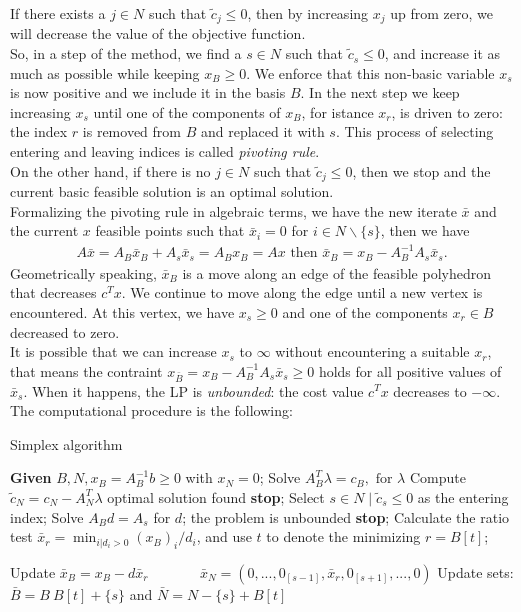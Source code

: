 \documentclass[a4paper,10 pt,titlepage,twoside]{book}
\theoremstyle{plain}
\theoremstyle{definition}
\theoremstyle{remark}
\begin{document}
 If there exists a $j \in N$ such that $\widetilde{c}_{j} \leq 0$, then by increasing $x_{j}$ up from zero, we will decrease the value of the objective function.\\
So, in a step of the method, we find a $s \in N$ such that $\widetilde{c}_{s} \leq 0$, and increase it as much as possible while keeping $x_{B} \geq 0$. We enforce that this non-basic variable $x_{s}$ is now positive and we include it in the basis $B$.
In the next step we keep increasing $x_{s}$ until one of the components of $x_{B}$, for istance $x_{r}$, is driven to zero: the index $r$ is removed from $B$ and replaced it with $s$. This process of selecting entering and leaving indices is called \textit{pivoting rule}. \\
On the other hand, if there is no $j \in N$ such that $\widetilde{c}_{j} \leq 0$, then we stop and the current basic feasible solution is an optimal solution. \\
Formalizing the pivoting rule in algebraic terms, we have the new iterate $\bar{x}$ and the current $x$ feasible points such that $\bar{x}_{i} = 0$ for $i \in N\backslash\{s\}$, then we have 
\begin{align*}
	A\bar{x} = A_{B}\bar{x}_{B} +A_{s}\bar{x}_{s} = A_{B}x_{B} = Ax \text{  then }
	\bar{x}_{B} = x_{B} - A_{B}^{-1}A_{s}\bar{x}_{s}.
\end{align*}
Geometrically speaking, $\bar{x}_{B}$ is a move along an edge of the feasible polyhedron that decreases $c^{T}x$. We continue to move along the edge until a new vertex is encountered. At this vertex, we have $x_{s}\geq0$ and one of the components $x_{r}\in B$ decreased to zero.\\
It is possible that we can increase $x_{s}$ to $\infty$ without encountering a suitable $x_{r}$, that means the contraint $x_{\bar{B}} = x_{B} - A_{B}^{-1}A_{s}\bar{x}_{s} \geq0$ holds for all positive values of $\bar{x}_{s}$. When it happens, the LP is \textit{unbounded}: the cost value $c^{T}x$ decreases to $-\infty$.\\
The computational procedure is the following:
\begin{algorithm}
	\caption{Simplex algorithm}
	\begin{algorithmic}[1]
		\State \textbf{Given} $B, N, x_{B} = A_{B}^{-1}b\geq 0$ with $x_{N}=0$;
		\State Solve $A_{B}^{T}\lambda = c_{B}, \text{ for }\lambda$
		\State Compute $\widetilde{c}_{N}=c_{N}-A_{N}^{T}\lambda$
		 optimal solution found \textbf{stop}; 
		\Else
		\State 	Select $s\in N\;|\;\widetilde{c}_{s}\leq 0$ as the entering index;
		\State Solve $A_{B}d = A_{s}$ for $d$;
		 the problem is unbounded \textbf{stop};
		\Else 
		\State Calculate the ratio test $\bar{x}_{r} = \min_{i | d_{i} > 0}(x_{B})_{i}/d_{i}$, and \State use $t$ to denote the minimizing $r = B[t]$;
		
		\State Update $\bar{x}_{B} = x_{B}-d\bar{x}_{r}$
		\State $\;\;\;\;\;\;\;\;\;\;\;\;\bar{x}_{N} = (0,...,0_{[s-1]},\bar{x}_{r},0_{[s+1]},...,0)$
		\State Update sets: $\bar{B} = B \ B[t] + \{s\}$ and $\bar{N} = N - \{s\} + B[t]$	
		\EndIf
	\end{algorithmic}
\end{algorithm}
\end{document}

